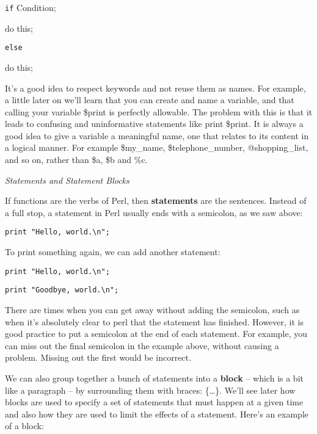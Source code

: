 \documentclass[a4paper,11pt]{book}
\begin{document}
\noindent 

\noindent \texttt{if} Condition;

\noindent do this;

\noindent 

\noindent \texttt{else}

\noindent do this;

\noindent 

\noindent It's a good idea to respect keywords and not reuse them as names. For example, a little later on we'll learn that you can create and name a variable, and that calling your variable \$print is perfectly allowable. The problem with this is that it leads to confusing and uninformative statements like print \$print. It is always a good idea to give a variable a meaningful name, one that relates to its content in a logical manner. For example \$my\_name, \$telephone\_number, @shopping\_list, and so on, rather than \$a, \$b and \%c.

\noindent 

\noindent \textit{Statements and Statement Blocks}

\noindent If functions are the verbs of Perl, then \textbf{statements }are the sentences. Instead of a full stop, a statement in Perl usually ends with a semicolon, as we saw above:

\noindent 

\noindent \texttt{print "Hello, world.\textbackslash n";}

\noindent 

\noindent To print something again, we can add another statement:

\noindent 

\noindent 

\noindent \texttt{print "Hello, world.\textbackslash n";}

\noindent \texttt{print "Goodbye, world.\textbackslash n";}

\noindent 

\noindent There are times when you can get away without adding the semicolon, such as when it's absolutely clear to perl that the statement has finished. However, it is good practice to put a semicolon at the end of each statement. For example, you can miss out the final semicolon in the example above, without causing a problem. Missing out the first would be incorrect.

\noindent 

\noindent We can also group together a bunch of statements into a \textbf{block }-- which is a bit like a paragraph -- by surrounding them with braces: \{\dots \}. We'll see later how blocks are used to specify a set of statements that must happen at a given time and also how they are used to limit the effects of a statement. Here's an example of a block:
\end{document}
